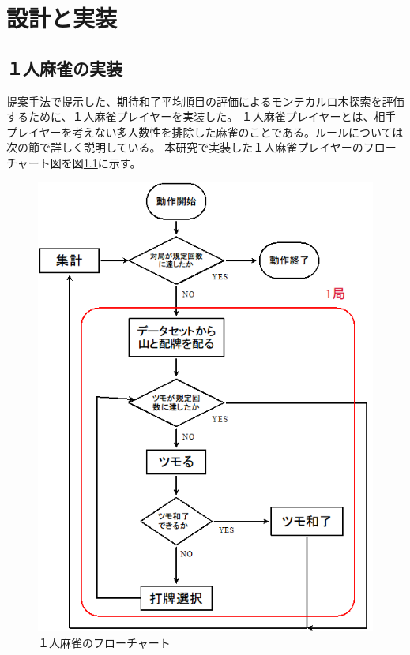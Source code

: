 \chapter{設計と実装}
\label{chap:implementation}
\section{１人麻雀の実装}
提案手法で提示した、期待和了平均順目の評価によるモンテカルロ木探索を評価するために、１人麻雀プレイヤーを実装した。
１人麻雀プレイヤーとは、相手プレイヤーを考えない多人数性を排除した麻雀のことである。ルールについては次の節で詳しく説明している。
本研究で実装した１人麻雀プレイヤーのフローチャート図を図\ref{1flow}に示す。

\begin{figure}[H]
 \centering
 \includegraphics[keepaspectratio, scale=0.7,bb=0 0 440 540]
      {img/1flow.png}
 \caption{１人麻雀のフローチャート}
 \label{1flow}
\end{figure}


